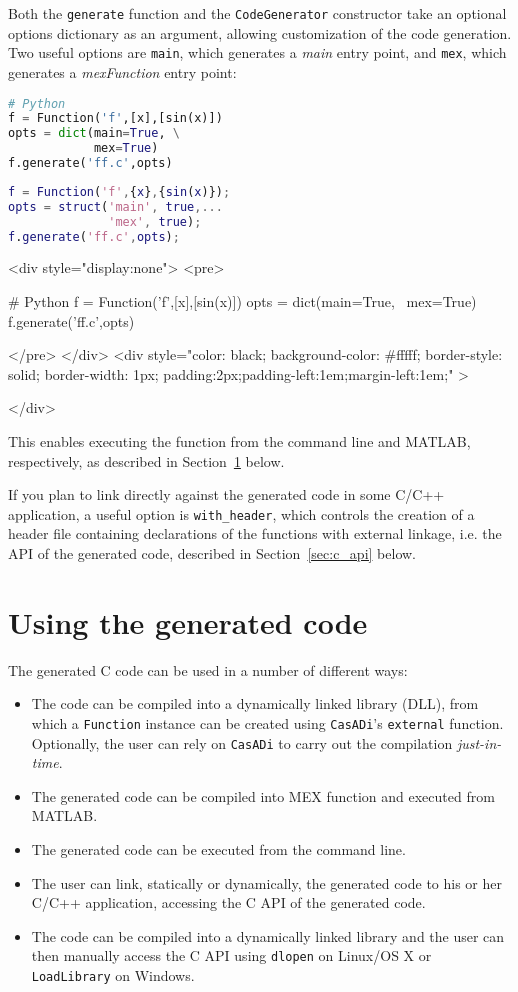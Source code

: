 \documentclass[a4paper,12pt]{book}
\newcommand{\CasADi}{\texttt{CasADi}\xspace}
\newcounter{pytexcount}
\newcounter{pytexsubcount}
\renewenvironment{pytexoutput}
{\addtocounter{pytexsubcount}{1}%
\begin{rawhtml}
<div style="display:none">
<pre>
\end{rawhtml}
}%
{\begin{rawhtml}
</pre>
</div>
<div style="color: black; background-color: \#fffff;  border-style: solid; border-width: 1px; padding:2px;padding-left:1em;margin-left:1em;" >\end{rawhtml}%
\verbatiminputeval{pytex_\alph{pytexcount}_\arabic{pytexsubcount}.log}%
\begin{rawhtml}
</div>
\end{rawhtml}
}
\begin{document}
Both the \texttt{generate} function and the \texttt{CodeGenerator} constructor take an optional
options dictionary as an argument, allowing customization of the code generation. Two useful
options are \verb|main|, which generates a \emph{main} entry point, and \verb|mex|,
which generates a \emph{mexFunction} entry point:

\begin{minipage}[t]{0.5\textwidth}
\begin{lstlisting}[language=Python]
# Python
f = Function('f',[x],[sin(x)])
opts = dict(main=True, \
            mex=True)
f.generate('ff.c',opts)
\end{lstlisting}
\end{minipage}
\begin{minipage}[t]{0.5\textwidth}
\begin{lstlisting}[language=Matlab]
% MATLAB
f = Function('f',{x},{sin(x)});
opts = struct('main', true,...
              'mex', true);
f.generate('ff.c',opts);
\end{lstlisting}
\end{minipage}
\begin{pytexoutput}
# Python
f = Function('f',[x],[sin(x)])
opts = dict(main=True, \
            mex=True)
f.generate('ff.c',opts)
\end{pytexoutput}

This enables executing the function from the command line and MATLAB, respectively,
as described in Section~\ref{sec:using_codegen} below.

If you plan to link directly against the generated code in some C/C++ application,
a useful option is \verb|with_header|, which controls the creation of a header file
containing declarations of the functions with external linkage, i.e. the API of
the generated code, described in Section~\ref{sec:c_api} below.

\section{Using the generated code} \label{sec:using_codegen}
The generated C code can be used in a number of different ways:
\begin{itemize}
  \item The code can be compiled into a dynamically linked library (DLL),
  from which a \texttt{Function} instance can be created using \CasADi's
  \texttt{external} function. Optionally, the user can rely on \CasADi to
  carry out the compilation \emph{just-in-time}.
  \item The generated code can be compiled into MEX function and executed from MATLAB.
  \item The generated code can be executed from the command line.
  \item The user can link, statically or dynamically, the generated code to his
  or her C/C++ application, accessing the C API of the generated code.
  \item The code can be compiled into a dynamically linked library and the user can then
  manually access the C API using \texttt{dlopen} on Linux/OS X or \texttt{LoadLibrary}
  on Windows.
\end{itemize}
\end{document}
